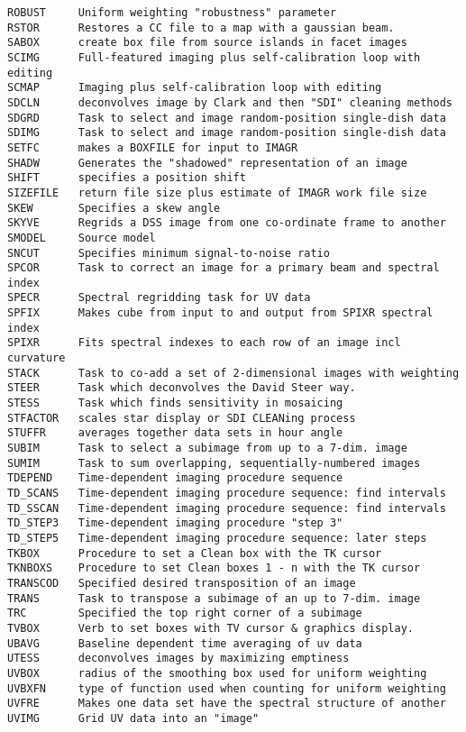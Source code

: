 \begin{verbatim}
ROBUST     Uniform weighting "robustness" parameter
RSTOR      Restores a CC file to a map with a gaussian beam.
SABOX      create box file from source islands in facet images
SCIMG      Full-featured imaging plus self-calibration loop with editing
SCMAP      Imaging plus self-calibration loop with editing
SDCLN      deconvolves image by Clark and then "SDI" cleaning methods
SDGRD      Task to select and image random-position single-dish data
SDIMG      Task to select and image random-position single-dish data
SETFC      makes a BOXFILE for input to IMAGR
SHADW      Generates the "shadowed" representation of an image
SHIFT      specifies a position shift
SIZEFILE   return file size plus estimate of IMAGR work file size
SKEW       Specifies a skew angle
SKYVE      Regrids a DSS image from one co-ordinate frame to another
SMODEL     Source model
SNCUT      Specifies minimum signal-to-noise ratio
SPCOR      Task to correct an image for a primary beam and spectral index
SPECR      Spectral regridding task for UV data
SPFIX      Makes cube from input to and output from SPIXR spectral index
SPIXR      Fits spectral indexes to each row of an image incl curvature
STACK      Task to co-add a set of 2-dimensional images with weighting
STEER      Task which deconvolves the David Steer way.
STESS      Task which finds sensitivity in mosaicing
STFACTOR   scales star display or SDI CLEANing process
STUFFR     averages together data sets in hour angle
SUBIM      Task to select a subimage from up to a 7-dim. image
SUMIM      Task to sum overlapping, sequentially-numbered images
TDEPEND    Time-dependent imaging procedure sequence
TD_SCANS   Time-dependent imaging procedure sequence: find intervals
TD_SSCAN   Time-dependent imaging procedure sequence: find intervals
TD_STEP3   Time-dependent imaging procedure "step 3"
TD_STEP5   Time-dependent imaging procedure sequence: later steps
TKBOX      Procedure to set a Clean box with the TK cursor
TKNBOXS    Procedure to set Clean boxes 1 - n with the TK cursor
TRANSCOD   Specified desired transposition of an image
TRANS      Task to transpose a subimage of an up to 7-dim. image
TRC        Specified the top right corner of a subimage
TVBOX      Verb to set boxes with TV cursor & graphics display.
UBAVG      Baseline dependent time averaging of uv data
UTESS      deconvolves images by maximizing emptiness
UVBOX      radius of the smoothing box used for uniform weighting
UVBXFN     type of function used when counting for uniform weighting
UVFRE      Makes one data set have the spectral structure of another
UVIMG      Grid UV data into an "image"

\end{verbatim}

